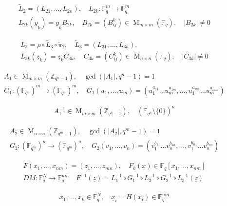 \documentclass[12pt]{article}
\begin{document}
\begin{gather*}
\tilde{L}_2=(L_{21},\dots,L_{2n}),\quad
L_{2k}:\mathbb{F}_q^m\to\mathbb{F}_q^m\\
L_{2k}(\underline{y}_k)=\underline{y}_k B_{2k},\quad
B_{2k}=(B_{ij}^k)\in\operatorname{M}_{m\times m}(\mathbb{F}_q),\quad
|B_{2k}|\neq 0
\end{gather*}

\begin{gather*}
L_3=\rho\circ\tilde{L}_3\circ\tilde{\pi}_2,\quad
\tilde{L}_3=(L_{31},\dots,L_{3n}),\\
L_{3k}(\underline{z}_k)=\underline{z}_k C_{3k},\quad
C_{3k}=(C_{ij}^k)\in\operatorname{M}_{n\times n}(\mathbb{F}_q),\quad
|C_{3k}|\neq 0
\end{gather*}

\begin{gather*}
A_1\in\operatorname{M}_{m\times m}(\mathbb{Z}_{q^n-1}),\quad \gcd(|A_1|,q^n-1)=1\\
G_1:(\mathbb{F}_{q^n})^m\to(\mathbb{F}_{q^n})^m,\quad
G_1(u_1,\dots,u_m)=(u_1^{a_{11}}\dots u_m^{a_{1m}},\dots,u_1^{a_{m1}}\dots u_m^{a_{mm}})
\end{gather*}

\begin{gather*}
A_1^{-1}\in\operatorname{M}_{m\times m}(\mathbb{Z}_{q^n-1}),\quad 
(\mathbb{F}_{q^n}\setminus\{0\})^n
\end{gather*}

\begin{gather*}
A_2\in\operatorname{M}_{n\times n}(\mathbb{Z}_{q^m-1}),\quad\gcd(|A_2|,q^m-1)=1\\
G_2:(\mathbb{F}_{q^m})^n\to(\mathbb{F}_{q^m})^n,\quad
G_2(v_1,\dots,v_n)=(v_1^{b_{11}}\dots v_n^{b_{1n}},\dots,v_1^{b_{n1}}\dots v_n^{b_{nn}})
\end{gather*}

\begin{gather*}
F(x_{1},\dots,x_{nm})=(z_{1},\dots,z_{mn}),\quad F_k(\underline{x})\in\mathbb{F}_q[x_{1},\dots,x_{nm}]\\
DM:\mathbb{F}_q^N\to\mathbb{F}_q^{nm}\quad
F^{-1}(\underline{z})=L_1^{-1}\circ G_1^{-1}\circ L_2^{-1}\circ G_2^{-1}\circ L_3^{-1}(\underline{z})
\end{gather*}

\begin{gather*}
\overline{x}_1,\dots,\overline{x}_k\in\mathbb{F}_q^N,\quad
\underline{x}_i=H(\overline{x}_i)\in\mathbb{F}_q^{nm}
\end{gather*}
\end{document}
